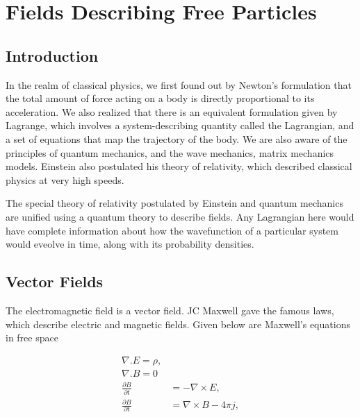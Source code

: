 
\chapter{Fields Describing Free Particles} %

\label{Chapter1} %



\section{Introduction}

In the realm of classical physics, we first found out by Newton's formulation that the total amount of force acting on a body is directly proportional to its acceleration. We also realized that there is an equivalent formulation given by Lagrange, which involves a system-describing quantity called the Lagrangian, and a set of equations that map the trajectory of the body. We are also aware of the principles of quantum mechanics, and the wave mechanics, matrix mechanics models. Einstein also postulated his theory of relativity, which described classical physics at very high speeds.

The special theory of relativity postulated by Einstein and quantum mechanics are unified using a quantum theory to describe fields. Any Lagrangian here would have complete information about how the wavefunction of a particular system would eveolve in time, along with its probability densities.

\section{Vector Fields}
The electromagnetic field is a vector field. JC Maxwell gave the famous laws, which describe electric and magnetic fields. Given below are Maxwell's equations in free space

\begin{subequations}
\begin{align}
{\nabla}.E=\rho,\\
{\nabla}.B=0\\
\frac{\partial B}{\partial t}&=-\nabla \times E,\\
\frac{\partial B}{\partial t}&=\nabla \times B - 4\pi j,
\end{align}
\end{subequations}

